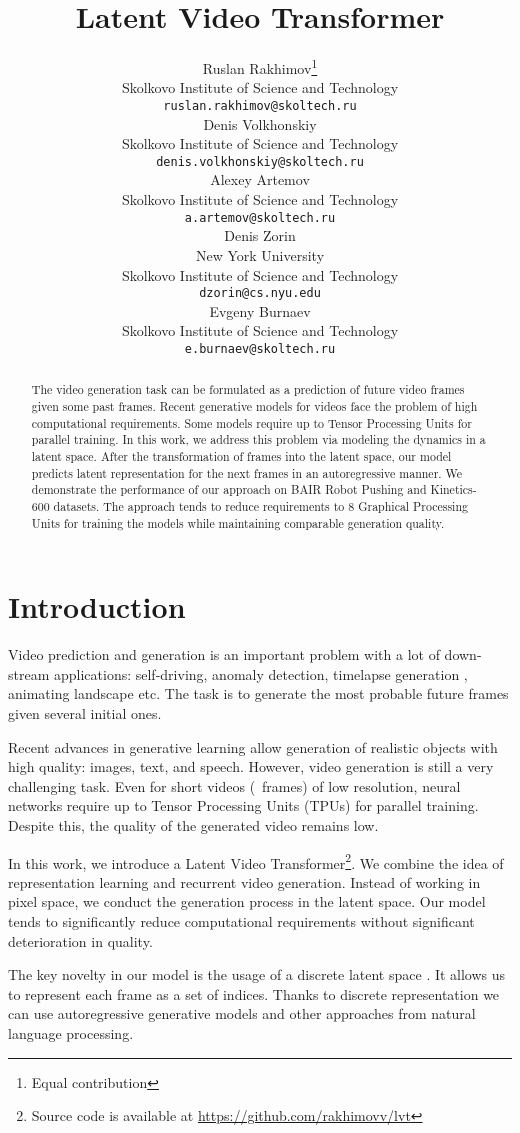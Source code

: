 \documentclass{article}
\title{Latent Video Transformer}
\author{Ruslan Rakhimov\thanks{Equal contribution} \\
   Skolkovo Institute of Science and Technology \\
  \texttt{ruslan.rakhimov@skoltech.ru} \\
\And
   Denis Volkhonskiy \\
   Skolkovo Institute of Science and Technology \\
   \texttt{denis.volkhonskiy@skoltech.ru} \\
   \AND
   Alexey Artemov \\
   Skolkovo Institute of Science and Technology \\
   \texttt{a.artemov@skoltech.ru} \\
   \And
   Denis Zorin \\
   New York University \\
   Skolkovo Institute of Science and Technology \\
   \texttt{dzorin@cs.nyu.edu} \\
   \And
   Evgeny Burnaev \\
   Skolkovo Institute of Science and Technology \\
   \texttt{e.burnaev@skoltech.ru} \\
}
\begin{document}
\maketitle

\begin{abstract}
The video generation task can be formulated as a prediction of future video frames given some past frames. Recent generative models for videos face the problem of high computational requirements. Some models require up to  Tensor Processing Units for parallel training. In this work, we address this problem via modeling the dynamics in a latent space. After the transformation of frames into the latent space, our model predicts latent representation for the next frames in an autoregressive manner. We demonstrate the performance of our approach on BAIR Robot Pushing and Kinetics-600 datasets. The approach tends to reduce requirements to 8 Graphical Processing Units for training the models while maintaining comparable generation quality.
\end{abstract} \section{Introduction}

Video prediction and generation is an important problem with a lot of down-stream applications: self-driving, anomaly detection, timelapse generation \cite{timelapse_generation}, animating landscape \cite{animating_landscape} etc. The task is to generate the most probable future frames given several initial ones.




Recent advances in generative learning allow generation of realistic objects with high quality: images, text, and speech. However, video generation is still a very challenging task. Even for short videos (~frames) of low resolution, neural networks require up to  Tensor Processing Units (TPUs) \cite{dvdgan2} for parallel training. Despite this, the quality of the generated video remains low.

In this work, we introduce a Latent Video Transformer\footnote{Source code is available at \url{https://github.com/rakhimovv/lvt}}. We combine the idea of representation learning and recurrent video generation. Instead of working in pixel space, we conduct the generation process in the latent space. Our model tends to significantly reduce computational requirements without significant deterioration in quality.

The key novelty in our model is the usage of a discrete latent space \cite{vqvae}. It allows us to represent each frame as a set of indices. Thanks to discrete representation we can use autoregressive generative models and other approaches from natural language processing.
\end{document}
